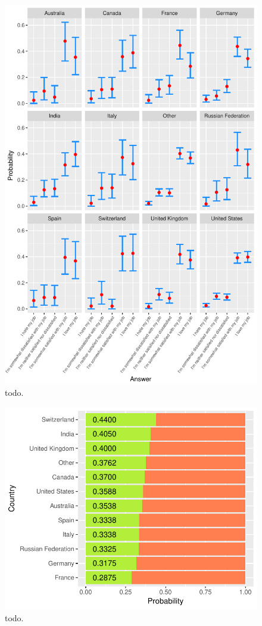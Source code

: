 \documentclass{article}
\begin{document}
\begin{figure}[H]
\centering
\includegraphics{report-012}
\caption{todo.}\label{fig_2}
\end{figure}


\begin{figure}[H]
\centering
\includegraphics{report-014}
\caption{todo.}\label{fig_3}
\end{figure}
\end{document}
